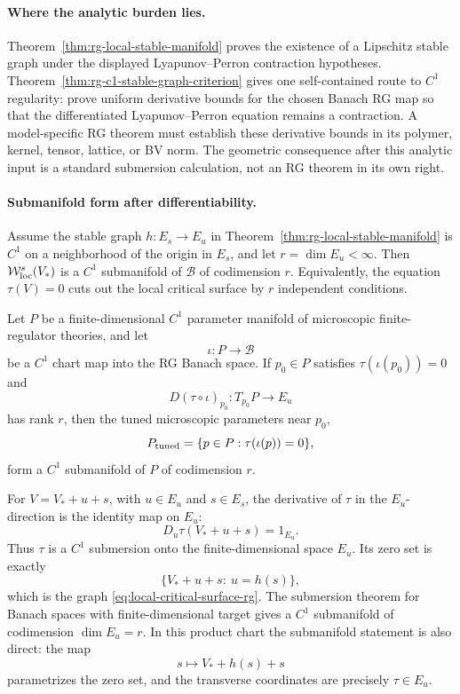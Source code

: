 \paragraph{Where the analytic burden lies.}
Theorem~\ref{thm:rg-local-stable-manifold} proves the existence of a Lipschitz
stable graph under the displayed Lyapunov--Perron contraction hypotheses.
Theorem~\ref{thm:rg-c1-stable-graph-criterion} gives one self-contained
route to \(C^1\) regularity: prove uniform derivative bounds for the chosen
Banach RG map so that the differentiated Lyapunov--Perron equation remains a
contraction.  A model-specific RG theorem must establish these derivative
bounds in its polymer, kernel, tensor, lattice, or BV norm.  The geometric
consequence after this analytic input is a standard submersion calculation,
not an RG theorem in its own right.

\paragraph{Submanifold form after differentiability.}
Assume the stable graph \(h:E_s\to E_u\) in
Theorem~\ref{thm:rg-local-stable-manifold} is \(C^1\) on a neighborhood of
the origin in \(E_s\), and let \(r=\dim E_u<\infty\).  Then
\(\mathcal W^s_{\rm loc}(V_\ast)\) is a \(C^1\) submanifold of
\(\mathcal B\) of codimension \(r\).  Equivalently, the equation
\(\tau(V)=0\) cuts out the local critical surface by \(r\) independent
conditions.

Let \(P\) be a finite-dimensional \(C^1\) parameter manifold of microscopic
finite-regulator theories, and let
\[
  \iota:P\longrightarrow\mathcal B
\]
be a \(C^1\) chart map into the RG Banach space.  If \(p_0\in P\) satisfies
\(\tau(\iota(p_0))=0\) and
\begin{equation}
  D(\tau\circ\iota)_{p_0}:T_{p_0}P\longrightarrow E_u
  \label{eq:rg-tuning-transversality}
\end{equation}
has rank \(r\), then the tuned microscopic parameters near \(p_0\),
\begin{equation}
  P_{\rm tuned}
  =
  \{p\in P:\tau(\iota(p))=0\},
  \label{eq:tuned-microscopic-parameter-surface}
\end{equation}
form a \(C^1\) submanifold of \(P\) of codimension \(r\).

For \(V=V_\ast+u+s\), with \(u\in E_u\) and \(s\in E_s\), the derivative of
\(\tau\) in the \(E_u\)-direction is the identity map on \(E_u\):
\begin{equation}
  D_u\tau(V_\ast+u+s)=1_{E_u}.
  \label{eq:tuning-map-submersion}
\end{equation}
Thus \(\tau\) is a \(C^1\) submersion onto the finite-dimensional space
\(E_u\).  Its zero set is exactly
\[
  \{V_\ast+u+s:\ u=h(s)\},
\]
which is the graph \eqref{eq:local-critical-surface-rg}.  The submersion
theorem for Banach spaces with finite-dimensional target gives a \(C^1\)
submanifold of codimension \(\dim E_u=r\).  In this product chart the
submanifold statement is also direct: the map
\[
  s\longmapsto V_\ast+h(s)+s
\]
parametrizes the zero set, and the transverse coordinates are precisely
\(\tau\in E_u\).

